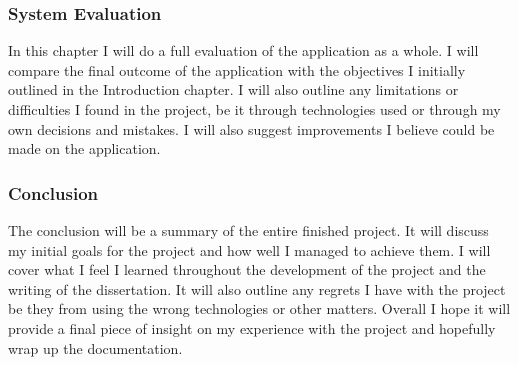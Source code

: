     \subsubsection{System Evaluation}
    In this chapter I will do a full evaluation of the application as a whole. I will compare the final outcome of the application with the objectives I initially outlined in the Introduction chapter. I will also outline any limitations or difficulties I found in the project, be it through technologies used or through my own decisions and mistakes. I will also suggest improvements I believe could be made on the application.
    
    \subsubsection{Conclusion}
    The conclusion will be a summary of the entire finished project. It will discuss my initial goals for the project and how well I managed to achieve them. I will cover what I feel I learned throughout the development of the project and the writing of the dissertation. It will also outline any regrets I have with the project be they from using the wrong technologies or other matters. Overall I hope it will provide a final piece of insight on my experience with the project and hopefully wrap up the documentation.